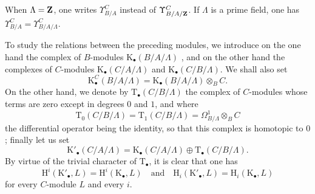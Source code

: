 \begin{env}[20.6.14]
When $\Lambda=\mathbf{Z}$, one writes $\Upsilon^C_{B/A}$ instead of $\Upsilon^C_{B/A/\mathbf{Z}}$.
If $\Lambda$ is a prime field, one has $\Upsilon^C_{B/A}=\Upsilon^C_{B/A/\Lambda}$.
\end{env}

\begin{env}[20.6.15]
\label{0.20.6.15}
To study the relations between the preceding modules, we introduce on the one hand the complex of $B$-modules $\mathrm{K}_\bullet(B/A/\Lambda)$ , and on the other hand the complexes
of $C$-modules $\mathrm{K}_\bullet(C/A/\Lambda)$ and $\mathrm{K}_\bullet(C/B/\Lambda)$.
We shall also set
\begin{equation}
\tag{20.6.15.1}
  \label{0.20.6.15.1}
  \mathrm{K}^C_\bullet(B/A/\Lambda)=\mathrm{K}_\bullet(B/A/\Lambda)\otimes_B C.
\end{equation}
On the other hand, we denote by $\mathrm{T}_\bullet(C/B/\Lambda)$ the complex of $C$-modules whose terms are zero except in degrees $0$ and $1$, and where
\begin{equation}
\tag{20.6.15.2}
  \label{0.20.6.15.2}
  \mathrm{T}_0(C/B/\Lambda)=\mathrm{T}_1(C/B/\Lambda)=\Omega^1_{B/\Lambda}\otimes_B C
\end{equation}
the differential operator being the identity, so that this complex is homotopic to $0$; finally let us set
\begin{equation}
\tag{20.6.15.3}
  \label{0.20.6.15.3}
  \mathrm{K}'_\bullet(C/A/\Lambda)=\mathrm{K}_\bullet(C/A/\Lambda)\oplus\mathrm{T}_\bullet(C/B/\Lambda).
\end{equation}
By virtue of the trivial character of $\mathrm{T}_\bullet$, it is clear that one has
\begin{equation}
\tag{20.6.15.4}
  \label{0.20.6.15.4}
  \mathrm{H}^i(\mathrm{K}'_\bullet,L)=\mathrm{H}^i(\mathrm{K}_\bullet,L)\quad\text{and}\quad\mathrm{H}_i(\mathrm{K}'_\bullet,L)=\mathrm{H}_i(\mathrm{K}_\bullet,L)
\end{equation}
for every $C$-module $L$ and every $i$.
\end{env}


